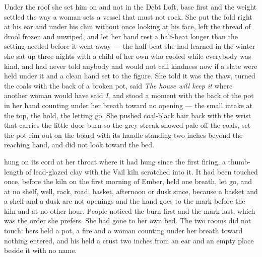 Under the roof she set him on  and not in the Debt Loft, base first and the weight settled the way a woman sets a vessel that must not rock. She put the fold right at his ear and under his chin without once looking at his face, left the thread of drool frozen and unwiped, and let her hand rest a half-beat longer than the setting needed before it went away --- the half-beat she had learned in the winter she sat up three nights with a child of her own who cooled while everybody was kind, and had never told anybody and would not call kindness now if a slate were held under it and a clean hand set to the figure. She told  it was the thaw, turned the coals with the back of a broken pot, said \emph{The house will keep it} where another woman would have said \emph{I}, and stood a moment with the back of the pot in her hand counting under her breath toward no opening --- the small intake at the top, the hold, the letting go. She pushed coal-black hair back with the wrist that carries the little-door burn so the grey streak showed pale off the coals, set the pot rim out on the board with its handle standing two inches beyond the reaching hand, and did not look toward the bed.

 hung on its cord at her throat where it had hung since the first firing, a thumb-length of lead-glazed clay with the Vail kiln scratched into it. It had been touched once, before the kiln on the first morning of Ember, held one breath, let go, and at no shelf, well, rack, road, basket, afternoon or dusk since, because a basket and a shelf and a dusk are not openings and the hand goes to the mark before the kiln and at no other hour. People noticed the burn first and the mark last, which was the order she prefers. She had gone to her own bed. The two rooms did not touch: hers held a pot, a fire and a woman counting under her breath toward nothing entered, and his held a crust two inches from an ear and an empty place beside it with no name.

\scenebreak

